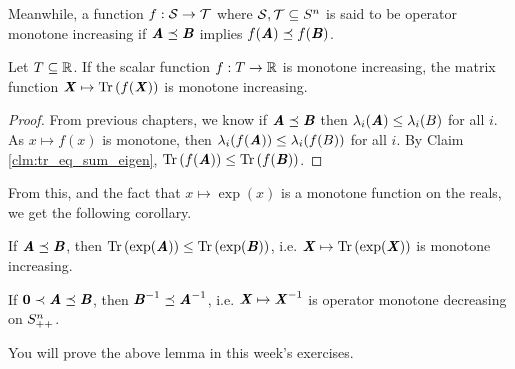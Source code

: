  Meanwhile, a function $f : \calS \to \calT$ where $\calS, \calT \subseteq \symsetn$
  is said to be operator monotone increasing if $\AA \preceq \BB $ implies
  $f(\AA) \preceq f(\BB)$.
%
\begin{lemma}
  Let $T \subseteq \R$.
  If the scalar function $f : T \to \R$ is monotone increasing, the matrix
  function $\XX \mapsto \trace{f(\XX)}$ is monotone increasing.
\end{lemma}
\begin{proof}
  From previous chapters, we know if $\AA\preceq\BB$ then $\lambda_i(\AA)\leq\lambda_i(B)$ for all $i$.
  As $x \mapsto f(x)$ is monotone, then $\lambda_i(f(\AA))\leq\lambda_i(f(B))$ for all $i$.
  By Claim \ref{clm:tr_eq_sum_eigen}, $\trace{f(\AA)}\leq\trace{f(\BB)}$.
\end{proof}
From this, and the fact that $x \mapsto \exp(x)$ is a monotone function on the
reals, we get the following corollary.
\begin{corollary}\label{cor:trexpmono}
  If $\AA\preceq\BB$, then $\trace{\exp(\AA)}\leq\trace{\exp(\BB)}$,
  i.e. $\XX \mapsto \trace{\exp(\XX)}$ is monotone increasing.
\end{corollary}

\begin{lemma}\label{lem:invmono}
  If $\matzero \prec\AA\preceq\BB$, then $\BB^{-1}\preceq \AA^{-1}$, i.e. $\XX
  \mapsto \XX^{-1}$ is operator monotone decreasing on $\pdsetn$.
\end{lemma}
You will prove the above lemma in this week's exercises.

